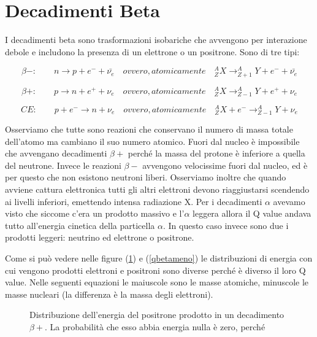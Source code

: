 \documentclass [a4paper, twoside] {book}
\begin{document}
\section{Decadimenti Beta}

I decadimenti beta sono trasformazioni isobariche che avvengono per interazione debole e includono la presenza di un elettrone o un positrone. Sono di tre tipi:

\begin{equation}
\beta-: \qquad n \longrightarrow p + e^-+\bar{\nu_e}  \quad ovvero, atomicamente \quad  ^A_ZX \longrightarrow _{Z+1}^AY+e^-+\bar{\nu_e}
\end{equation}


\begin{equation}
\beta+: \qquad p \longrightarrow n + e^++\nu_e \quad ovvero, atomicamente \quad  ^A_ZX \longrightarrow _{Z-1}^AY+e^++\nu_e
\end{equation}


\begin{equation}
CE: \qquad p + e^- \longrightarrow n + \nu_e \quad ovvero, atomicamente \quad  ^A_ZX+e^- \longrightarrow _{Z-1}^AY+\nu_e
\end{equation}

Osserviamo che tutte sono reazioni che conservano il numero di massa totale dell'atomo ma cambiano il suo numero atomico.
Fuori dal nucleo è impossibile che avvengano decadimenti $\beta+$ perché la massa del protone è inferiore a quella del neutrone. Invece le reazioni $\beta-$ avvengono velocissime fuori dal nucleo, ed è per questo che non esistono neutroni liberi.
Osserviamo inoltre che quando avviene cattura elettronica tutti gli altri elettroni devono riaggiustarsi scendendo ai livelli inferiori, emettendo intensa radiazione X.
Per i decadimenti $\alpha$ avevamo visto che siccome c'era un prodotto massivo e l'$\alpha$ leggera allora il Q value andava tutto all'energia cinetica della particella $\alpha$. In questo caso invece sono due i prodotti leggeri: neutrino ed elettrone o positrone.

 Come si può vedere nelle figure (\ref{qbetapiu}) e (\ref{qbetameno}) le distribuzioni di energia con cui vengono prodotti elettroni e positroni sono diverse perché è diverso il loro Q value. Nelle seguenti equazioni le maiuscole sono le masse atomiche, minuscole le masse nucleari (la differenza è la massa degli elettroni).

\begin{figure} []
\centering
		\caption{Distribuzione dell'energia del positrone prodotto in un decadimento $\beta+$. La probabilità che esso abbia energia nulla è zero, perché}
         \label{qbetapiu}
\end{figure}
\end{document}
